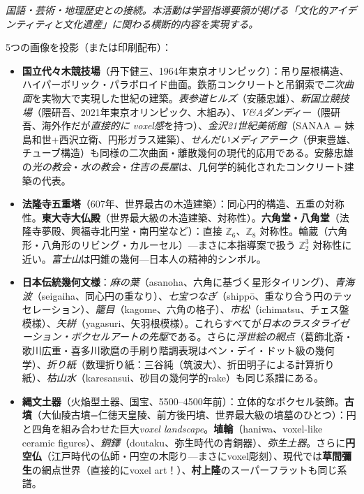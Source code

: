 \documentclass[12pt,a4paper]{scrartcl}
\newcommand{\acc}[1]{\textcolor{accent}{\textbf{#1}}}
\newcommand{\tempo}[1]{\textnormal{\footnotesize\color{bg!90!white}\textsf{#1}}}
\begin{document}
\begin{katsudou}[3.4 --- 日本の視覚文化遺産との対話 \quad\tempo{10分}]\label{at:34}
\emph{国語・芸術・地理歴史との接続。本活動は学習指導要領が掲げる「文化的アイデンティティと文化遺産」に関わる横断的内容を実現する。}

5つの画像を投影（または印刷配布）：

\begin{itemize}[leftmargin=1.3em,itemsep=0.2em,topsep=0.3em,nosep]
  \item \acc{国立代々木競技場}（丹下健三、1964年東京オリンピック）：吊り屋根構造、ハイパーボリック・パラボロイド曲面。鉄筋コンクリートと吊鋼索で\emph{二次曲面}を実物大で実現した世紀の建築。\emph{表参道ヒルズ}（安藤忠雄）、\emph{新国立競技場}（隈研吾、2021年東京オリンピック、木組み）、\emph{V\&Aダンディー}（隈研吾、海外作だが\emph{直接的に voxel感}を持つ）、\emph{金沢21世紀美術館}（SANAA = 妹島和世+西沢立衛、円形ガラス建築）、\emph{せんだいメディアテーク}（伊東豊雄、チューブ構造）も同様の二次曲面・離散幾何の現代的応用である。安藤忠雄の\emph{光の教会}・\emph{水の教会}・\emph{住吉の長屋}は、几何学的純化されたコンクリート建築の代表。

  \item \acc{法隆寺五重塔}（607年、世界最古の木造建築）：同心円的構造、五重の対称性。\acc{東大寺大仏殿}（世界最大級の木造建築、対称性）。\acc{六角堂・八角堂}（法隆寺夢殿、興福寺北円堂・南円堂など）：直接 $\mathbb{Z}_6$、$\mathbb{Z}_8$ 対称性。輪蔵（六角形・八角形のリビング・カルーセル）---まさに本指導案で扱う $\mathbb{Z}_2^3$ 対称性に近い。\emph{富士山}は円錐の幾何---日本人の精神的シンボル。

  \item \acc{日本伝統幾何文様}：\emph{麻の葉}（asanoha、六角に基づく星形タイリング）、\emph{青海波}（seigaiha、同心円の重なり）、\emph{七宝つなぎ}（shippō、重なり合う円のテッセレーション）、\emph{籠目}（kagome、六角の格子）、\emph{市松}（ichimatsu、チェス盤模様）、\emph{矢絣}（yagasuri、矢羽根模様）。これらすべてが\emph{日本のラスタライゼーション・ボクセルアートの先駆}である。さらに\emph{浮世絵の網点}（葛飾北斎・歌川広重・喜多川歌麿の手刷り階調表現はベン・デイ・ドット級の幾何学）、\emph{折り紙}（数理折り紙：三谷純（筑波大）、折田明子による計算折り紙）、\emph{枯山水}（karesansui、砂目の幾何学的rake）も同じ系譜にある。

  \item \acc{縄文土器}（火焔型土器、国宝、5500--4500年前）：立体的なボクセル装飾。\acc{古墳}（大仙陵古墳=仁徳天皇陵、前方後円墳、世界最大級の墳墓のひとつ）：円と四角を組み合わせた巨大\emph{voxel landscape}。\acc{埴輪}（haniwa、voxel-like ceramic figures）、\emph{銅鐸}（doutaku、弥生時代の青銅器）、\emph{弥生土器}。さらに\acc{円空仏}（江戸時代の仏師・円空の木彫り---まさにvoxel彫刻）、現代では\acc{草間彌生}の網点世界（直接的にvoxel art！）、\acc{村上隆}のスーパーフラットも同じ系譜。


\end{itemize}
\end{katsudou}
\end{document}
